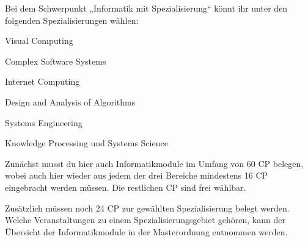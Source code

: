 Bei dem Schwerpunkt „Informatik mit Spezialisierung“ könnt ihr unter den folgenden Spezialisierungen wählen:
\begin{noindItemize}
\item Visual Computing
\item Complex Software Systems
\item Internet Computing
\item Design and Analysis of Algorithms
\item Systems Engineering
\item  Knowledge Processing und Systems Science
\end{noindItemize}

Zunächst musst du hier auch Informatikmodule im Umfang von 60 CP belegen, wobei auch hier wieder aus jedem der drei Bereiche mindestens 16 CP eingebracht werden müssen. Die restlichen CP sind frei wählbar.

Zusätzlich müssen noch 24 CP zur gewählten Spezialisierung belegt werden. Welche Veranstaltungen zu einem Spezialisierungsgebiet gehören, kann der Übersicht der Informatikmodule in der Masterordnung entnommen werden.